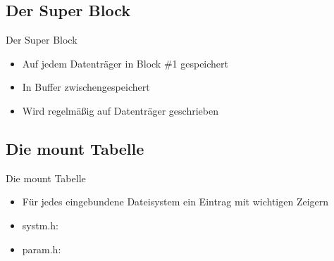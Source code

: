 \documentclass{beamer}
\begin{document}


\subsection{Der Super Block}

\begin{frame}{Der Super Block}
    \begin{itemize}
        \item Auf jedem Datenträger in Block \#1 gespeichert
        \item In Buffer zwischengespeichert
        \item Wird regelmäßig auf Datenträger geschrieben
    \end{itemize}

    \vfill

    
\end{frame}




\subsection{Die mount Tabelle}

\begin{frame}{Die mount Tabelle}
    \begin{itemize}
        \item Für jedes eingebundene Dateisystem ein Eintrag mit wichtigen Zeigern

        \vfill

        \item systm.h:
            \vspace{5pt}
            

        \vfill

        \item param.h:
            \vspace{5pt}
            

        \vfill
    \end{itemize}
\end{frame}


\end{document}
